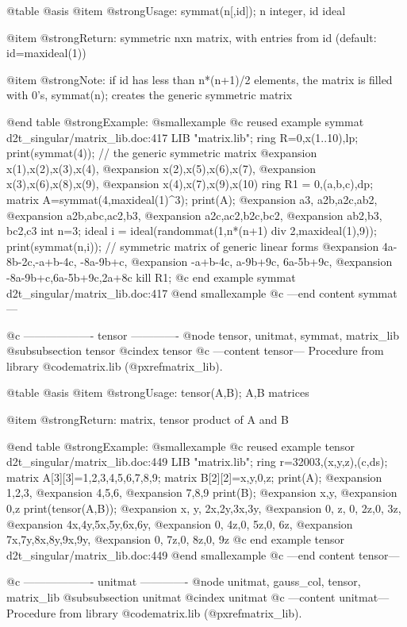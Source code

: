 @table @asis
@item @strong{Usage:}
symmat(n[,id]); n integer, id ideal

@item @strong{Return:}
symmetric nxn matrix, with entries from id (default: id=maxideal(1))

@item @strong{Note:}
if id has less than n*(n+1)/2 elements, the matrix is filled with 0's,
symmat(n); creates the generic symmetric matrix

@end table
@strong{Example:}
@smallexample
@c reused example symmat d2t_singular/matrix_lib.doc:417 
LIB "matrix.lib";
ring R=0,x(1..10),lp;
print(symmat(4));    // the generic symmetric matrix
@expansion{} x(1),x(2),x(3),x(4),
@expansion{} x(2),x(5),x(6),x(7),
@expansion{} x(3),x(6),x(8),x(9),
@expansion{} x(4),x(7),x(9),x(10)
ring R1 = 0,(a,b,c),dp;
matrix A=symmat(4,maxideal(1)^3);
print(A);
@expansion{} a3, a2b,a2c,ab2,
@expansion{} a2b,abc,ac2,b3, 
@expansion{} a2c,ac2,b2c,bc2,
@expansion{} ab2,b3, bc2,c3  
int n=3;
ideal i = ideal(randommat(1,n*(n+1) div 2,maxideal(1),9));
print(symmat(n,i));  // symmetric matrix of generic linear forms
@expansion{} 4a-8b-2c,-a+b-4c, -8a-9b+c,
@expansion{} -a+b-4c, a-9b+9c, 6a-5b+9c,
@expansion{} -8a-9b+c,6a-5b+9c,2a+8c    
kill R1;
@c end example symmat d2t_singular/matrix_lib.doc:417
@end smallexample
@c ---end content symmat---

@c ------------------- tensor -------------
@node tensor, unitmat, symmat, matrix_lib
@subsubsection tensor
@cindex tensor
@c ---content tensor---
Procedure from library @code{matrix.lib} (@pxref{matrix_lib}).

@table @asis
@item @strong{Usage:}
tensor(A,B); A,B matrices

@item @strong{Return:}
matrix, tensor product of A and B

@end table
@strong{Example:}
@smallexample
@c reused example tensor d2t_singular/matrix_lib.doc:449 
LIB "matrix.lib";
ring r=32003,(x,y,z),(c,ds);
matrix A[3][3]=1,2,3,4,5,6,7,8,9;
matrix B[2][2]=x,y,0,z;
print(A);
@expansion{} 1,2,3,
@expansion{} 4,5,6,
@expansion{} 7,8,9 
print(B);
@expansion{} x,y,
@expansion{} 0,z 
print(tensor(A,B));
@expansion{} x, y, 2x,2y,3x,3y,
@expansion{} 0, z, 0, 2z,0, 3z,
@expansion{} 4x,4y,5x,5y,6x,6y,
@expansion{} 0, 4z,0, 5z,0, 6z,
@expansion{} 7x,7y,8x,8y,9x,9y,
@expansion{} 0, 7z,0, 8z,0, 9z 
@c end example tensor d2t_singular/matrix_lib.doc:449
@end smallexample
@c ---end content tensor---

@c ------------------- unitmat -------------
@node unitmat, gauss_col, tensor, matrix_lib
@subsubsection unitmat
@cindex unitmat
@c ---content unitmat---
Procedure from library @code{matrix.lib} (@pxref{matrix_lib}).

